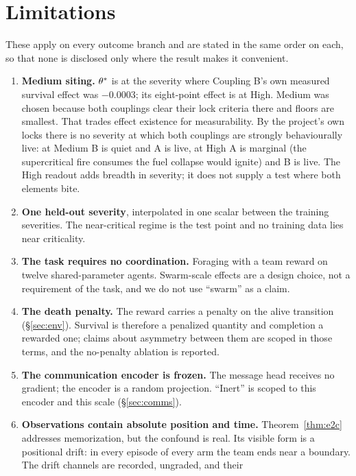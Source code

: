 \section{Limitations}
\label{sec:limits}

These apply on every outcome branch and are stated in the same order on each,
so that none is disclosed only where the result makes it convenient.

\begin{enumerate}[leftmargin=*,itemsep=2pt]
  \item \textbf{Medium siting.} $\theta^{\ast}$ is at the severity where
  Coupling B's own measured survival effect was $-0.0003$; its eight-point
  effect is at High. Medium was chosen because both couplings clear their lock
  criteria there and floors are smallest. That trades effect existence for
  measurability. By the project's own locks there is no severity at which both
  couplings are strongly behaviourally live: at Medium B is quiet and A is
  live, at High A is marginal (the supercritical fire consumes the fuel
  collapse would ignite) and B is live. The High readout adds breadth in
  severity; it does not supply a test where both elements bite.
  \item \textbf{One held-out severity}, interpolated in one scalar between the
  training severities. The near-critical regime is the test point and no
  training data lies near criticality.
  \item \textbf{The task requires no coordination.} Foraging with a team
  reward on twelve shared-parameter agents. Swarm-scale effects are a design
  choice, not a requirement of the task, and we do not use ``swarm'' as a
  claim.
  \item \textbf{The death penalty.} The reward carries a penalty on the alive
  transition (\S\ref{sec:env}). Survival is therefore a penalized quantity
  and completion a rewarded one; claims about asymmetry between them are
  scoped in those terms, and the no-penalty ablation is reported.
  \item \textbf{The communication encoder is frozen.} The message head
  receives no gradient; the encoder is a random projection. ``Inert'' is
  scoped to this encoder and this scale (\S\ref{sec:comms}).
  \item \textbf{Observations contain absolute position and time.}
  Theorem~\ref{thm:e2c} addresses memorization, but the confound is real. Its
  visible form is a positional drift: in every episode of every arm the team
  ends near a boundary. The drift channels are recorded, ungraded, and their

\end{enumerate}

